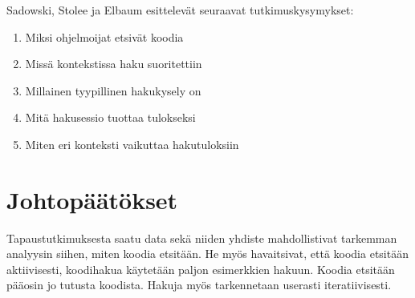 \documentclass[finnish]{../tktltiki2}
\theoremstyle{definition}
\theoremstyle{remark}
\begin{document}
Sadowski, Stolee ja Elbaum esittelevät seuraavat tutkimuskysymykset:

\begin{enumerate}
  \item Miksi ohjelmoijat etsivät koodia
  \item Missä kontekstissa haku suoritettiin
  \item Millainen tyypillinen hakukysely on
  \item Mitä hakusessio tuottaa tulokseksi
  \item Miten eri konteksti vaikuttaa hakutuloksiin
\end{enumerate}

\section{Johtopäätökset}
Tapaustutkimuksesta saatu data sekä niiden yhdiste mahdollistivat tarkemman analyysin siihen, miten koodia etsitään. He myös havaitsivat, että koodia etsitään aktiivisesti, koodihakua käytetään paljon esimerkkien hakuun. Koodia etsitään pääosin jo tutusta koodista. Hakuja myös tarkennetaan userasti iteratiivisesti.
\end{document}
